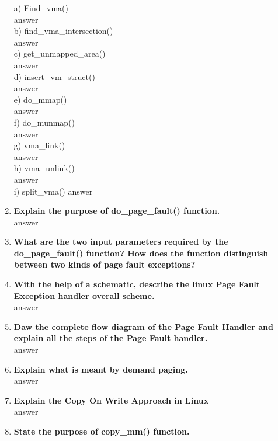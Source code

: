 \documentclass[a4paper,12pt]{article}
\begin{document}
\begin{flushleft}
\begin{enumerate}
a) Find\_vma() \\
{\color{red}answer}\\
b) find\_vma\_intersection()\\
{\color{red}answer}\\
 c) get\_unmapped\_area()\\
 {\color{red}answer}\\
d) insert\_vm\_struct()\\
 {\color{red}answer}\\
 e) do\_mmap()\\
 {\color{red}answer}\\
  f) do\_munmap() \\
  {\color{red}answer}\\
  g) vma\_link()\\
{\color{red}answer}\\
h) vma\_unlink() \\
{\color{red}answer}\\
i) split\_vma()
{\color{red}answer}\\
\item \textbf{ Explain the purpose of do\_page\_fault() function.}\\
{\color{red}answer}\\
\item \textbf{ What are the two input parameters required by the do\_page\_fault() function? How does the function distinguish between two kinds of page fault exceptions?}\\
\item \textbf{ With the help of a schematic, describe the linux Page Fault Exception handler overall scheme.}\\
{\color{red}answer}\\
\item \textbf{ Daw the complete flow diagram of the Page Fault Handler and explain all the steps of the Page Fault handler.}\\
{\color{red}answer}\\
\item \textbf{ Explain what is meant by demand paging.}\\
{\color{red}answer}\\
\item \textbf{ Explain the Copy On Write Approach in Linux}\\
{\color{red}answer}\\
\item \textbf{ State the purpose of copy\_mm() function.}\\

\end{enumerate}
\end{flushleft}
\end{document}
